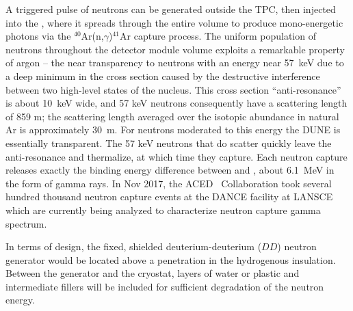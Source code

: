 A triggered pulse of neutrons can be generated outside the TPC, then injected into the , where it spreads through the entire volume to produce mono-energetic photons via the $^{40}$Ar(n,$\gamma$)$^{41}$Ar capture process. The uniform population of neutrons throughout the detector module volume exploits a remarkable property of argon -- the near transparency to neutrons with an energy near \SI{57}{\keV} due to a deep minimum in the cross section caused by the destructive interference between two high-level states of the  nucleus. This cross section ``anti-resonance'' is about \SI{10}{\keV} wide, and 57 keV neutrons consequently have a scattering length of 859 m; the scattering length averaged over the isotopic abundance in natural Ar is approximately 30~m. For neutrons moderated to this energy the DUNE  is essentially transparent. The 57 keV neutrons that do scatter quickly leave the anti-resonance and thermalize, at which time they capture. Each neutron capture releases exactly the binding energy difference between  and , about \SI{6.1}{\MeV} in the form of gamma rays. In Nov 2017, the ACED~\cite{aced-svoboda} Collaboration took several hundred thousand neutron capture events at the DANCE\cite{Reifarth:2013xny} facility at LANSCE which are currently being analyzed to characterize neutron capture gamma spectrum. 

In terms of design, the fixed, shielded deuterium-deuterium ($DD$) neutron generator would be located above a penetration in the hydrogenous insulation. Between the generator and the cryostat, layers of water or plastic and intermediate fillers will be included for sufficient degradation of the neutron energy. 



